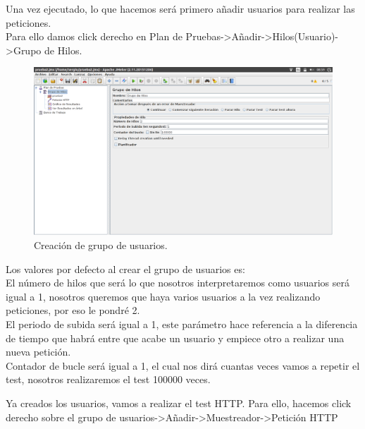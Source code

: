 Una vez ejecutado, lo que hacemos será primero añadir usuarios para realizar las peticiones.
\\Para ello damos click derecho en Plan de Pruebas->Añadir->Hilos(Usuario)->Grupo de Hilos.

\begin{figure}[H] %
	\centering
	\includegraphics[scale=0.35]{imagenes/grupo-hilos.png}  %
	\caption{Creación de grupo de usuarios.}
\end{figure}

Los valores por defecto al crear el grupo de usuarios es:
\\El número de hilos que será lo que nosotros interpretaremos como usuarios será igual a 1, nosotros queremos que haya varios usuarios a la vez realizando peticiones, por eso le pondré 2.
\\El periodo de subida será igual a 1, este parámetro hace referencia a la diferencia de tiempo que habrá entre que acabe un usuario y empiece otro a realizar una nueva petición.
\\Contador de bucle será igual a 1, el cual nos dirá cuantas veces vamos a repetir el test, nosotros realizaremos el test 100000 veces.

\setlength{\parskip}{10pt}

Ya creados los usuarios, vamos a realizar el test HTTP.
Para ello, hacemos click derecho sobre el grupo de usuarios->Añadir->Muestreador->Petición HTTP \cite{jmeter}

